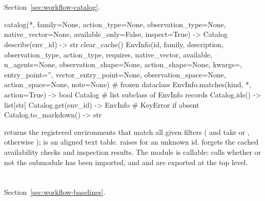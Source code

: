 \section{\texorpdfstring{}{env\_lib.catalog}}\label{sec:api-catalog}

Section~\ref{sec:workflow-catalog}.

\begin{pycode}
catalog(*, family=None, action_type=None, observation_type=None,
        native_vector=None, available_only=False, inspect=True) -> Catalog
describe(env_id) -> str
clear_cache()
EnvInfo(id, family, description, observation_type, action_type, requires,
        native_vector, available, n_agents=None, observation_shape=None,
        action_shape=None, kwargs={}, entry_point='', vector_entry_point=None,
        observation_space=None, action_space=None, note=None)  # frozen dataclass
EnvInfo.matches(kind, *, action=True) -> bool
Catalog                                   # list subclass of EnvInfo records
Catalog.ids() -> list[str]
Catalog.get(env_id) -> EnvInfo            # KeyError if absent
Catalog.to_markdown() -> str
\end{pycode}

 returns the registered environments that match all given
filters ( and  take
 or , otherwise );
 is an aligned text table.  raises
 for an unknown id.  forgets the cached
availability checks and inspection results. The module is callable:
 calls  whether or not the
submodule has been imported, and  and
 are exported at the top level.

\section{\texorpdfstring{}{env\_lib.baselines}}\label{sec:api-baselines}

Section~\ref{sec:workflow-baselines}.

